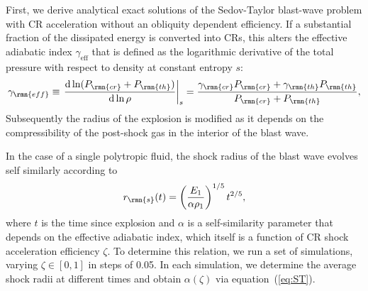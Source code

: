 \documentclass[8pt,a4paper,usenatbib]{mnras}
\newcommand{\CR}{\rmn{cr}}
\renewcommand{\th}{\rmn{th}}
\newcommand{\dd}[2]{\frac{\mathrm{d} #1}{\mathrm{d} #2}}
\begin{document}
First, we derive analytical exact solutions of the Sedov-Taylor blast-wave
problem with CR acceleration without an obliquity dependent efficiency. If a
substantial fraction of the dissipated energy is converted into CRs, this alters
the effective adiabatic index $\gamma_{\mathrm{eff}}$ that is defined as the logarithmic
derivative of the total pressure with respect to density at constant entropy $s$:
\begin{equation}
  \label{eq:gamma_i}
  \gamma_{\rmn{eff}} \equiv \left.\dd{\ln (P_\CR+P_\th)}{\ln\rho}\right|_s
  = \frac{\gamma_\CR P_{\CR} + \gamma_\th P_{\th}}{P_\CR+P_\th} ,
\end{equation}
Subsequently the radius of the explosion is modified as it depends on the
compressibility of the post-shock gas in the interior of the blast wave.

In the case of a single polytropic fluid, the shock radius of the
blast wave evolves self similarly according to
\begin{equation}
  \label{eq:ST}
r_{\rmn{s}}(t) = \left(\frac{E_1}{\alpha \rho_1}\right)^{1/5} t^{2/5},
\end{equation}
where $t$ is the time since explosion and $\alpha$ is a self-similarity
parameter that depends on the effective adiabatic index, which itself is a
function of CR shock acceleration efficiency $\zeta$. To determine this
relation, we run a set of simulations, varying $\zeta\in[0,1]$ in steps of
0.05. In each simulation, we determine the average shock radii at different
times and obtain $\alpha(\zeta)$ via equation~(\ref{eq:ST}).
\end{document}
